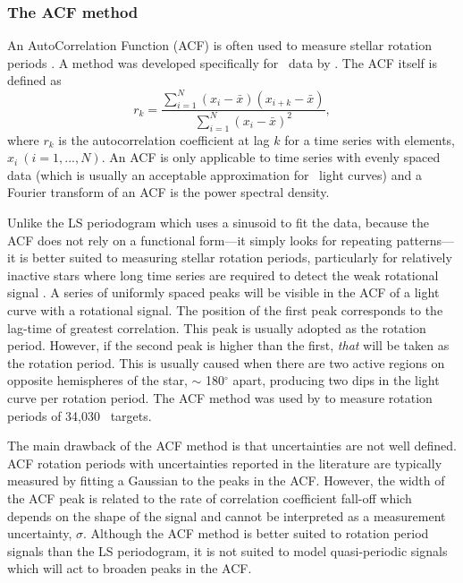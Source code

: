 \subsubsection{The ACF method}

An AutoCorrelation Function (ACF) is often used to measure stellar rotation
periods \citep[\eg][]{Aigrain2008, Mcquillan2013, Mcquillan13b,
Mcquillan2014, Garcia2014}.
A method was developed specifically for \kepler\ data by
\citet{Mcquillan2013}.
The ACF itself is defined as
\begin{equation}
    r_k = \frac{\sum_{i=1}^{N}(x_i-\bar{x})(x_{i+k}-\bar{x})}
    {\sum_{i=1}^{N}(x_i-\bar{x})^2},
\end{equation}
where $r_k$ is the autocorrelation coefficient at lag $k$ for a time series
with elements, $x_i~(i=1,..., N)$.
An ACF is only applicable to time series with evenly spaced data (which is
usually an acceptable approximation for \kepler\ light curves) and a Fourier
transform of an ACF is the power spectral density.

Unlike the LS periodogram which uses a sinusoid to fit the data, because the
ACF does not rely on a functional form---it simply looks for repeating
patterns---it is better suited to measuring stellar rotation periods,
particularly for relatively inactive stars where long time series are required
to detect the weak rotational signal \citep[see][for an in-depth
discussion]{Mcquillan2014}.
A series of uniformly spaced peaks will be visible in the ACF of a light curve
with a rotational signal.
The position of the first peak corresponds to the lag-time of greatest
correlation.
This peak is usually adopted as the rotation period.
However, if the second peak is higher than the first, {\it that} will be taken
as the rotation period.
This is usually caused when there are two active regions on opposite
hemispheres of the star, $\sim$ 180$^\circ$ apart, producing two dips in the
light curve per rotation period.
The ACF method was used by \citet{Mcquillan2014} to measure rotation periods
of 34,030 \kepler\ targets.

The main drawback of the ACF method is that uncertainties are not well
defined.
ACF rotation periods with uncertainties reported in the literature are
typically measured by fitting a Gaussian to the peaks in the ACF.
However, the width of the ACF peak is related to the rate of correlation
coefficient fall-off which depends on the shape of the signal and cannot be
interpreted as a measurement uncertainty, $\sigma$.
Although the ACF method is better suited to rotation period signals than the
LS periodogram, it is not suited to model quasi-periodic signals which will
act to broaden peaks in the ACF.

